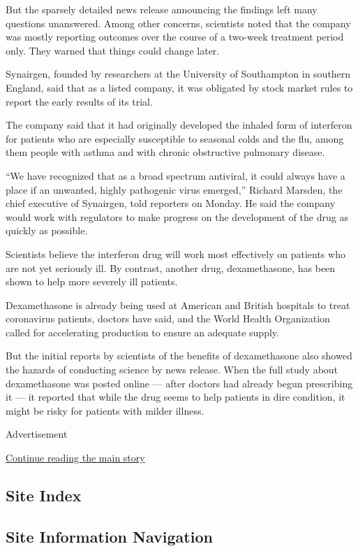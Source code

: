 But the sparsely detailed news release announcing the findings left many
questions unanswered. Among other concerns, scientists noted that the
company was mostly reporting outcomes over the course of a two-week
treatment period only. They warned that things could change later.

Synairgen, founded by researchers at the University of Southampton in
southern England, said that as a listed company, it was obligated by
stock market rules to report the early results of its trial.

The company said that it had originally developed the inhaled form of
interferon for patients who are especially susceptible to seasonal colds
and the flu, among them people with asthma and with chronic obstructive
pulmonary disease.

``We have recognized that as a broad spectrum antiviral, it could always
have a place if an unwanted, highly pathogenic virus emerged,'' Richard
Marsden, the chief executive of Synairgen, told reporters on Monday. He
said the company would work with regulators to make progress on the
development of the drug as quickly as possible.

Scientists believe the interferon drug will work most effectively on
patients who are not yet seriously ill. By contrast, another drug,
dexamethasone, has been shown to help more severely ill patients.

Dexamethasone is already being used at American and British hospitals to
treat coronavirus patients, doctors have said, and the World Health
Organization called for accelerating production to ensure an adequate
supply.

But the initial reports by scientists of the benefits of dexamethasone
also showed the hazards of conducting science by news release. When the
full study about dexamethasone was posted online --- after doctors had
already begun prescribing it --- it reported that while the drug seems
to help patients in dire condition, it might be risky for patients with
milder illness.

Advertisement

\protect\hyperlink{after-bottom}{Continue reading the main story}

\hypertarget{site-index}{%
\subsection{Site Index}\label{site-index}}

\hypertarget{site-information-navigation}{%
\subsection{Site Information
Navigation}\label{site-information-navigation}}


